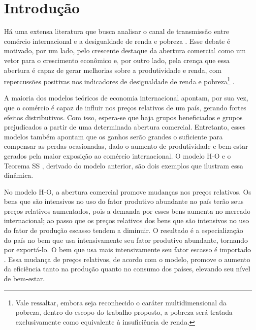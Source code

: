 

\pagestyle{fancy}
\fancyhf{}
\fancyhead[R]{\small\thepage}
\renewcommand{\headrulewidth}{0pt}

\chapter{Introdução} \label{cha:introducao}

Há uma extensa literatura que busca analisar o canal de transmissão entre comércio internacional e a desigualdade de renda e pobreza \cite{ferreira06, castilho12, bayar17, anderson20}. Esse debate é motivado, por um lado, pelo crescente destaque da abertura comercial como um vetor para o crescimento econômico \cite{atkin22} e, por outro lado, pela crença que essa abertura é capaz de gerar melhorias sobre a produtividade e renda, com repercussões positivas nos indicadores de desigualdade de renda e pobreza\footnote{Vale ressaltar, embora seja reconhecido o caráter multidimensional da pobreza, dentro do escopo do trabalho proposto, a pobreza será tratada exclusivamente como equivalente à insuficiência de renda.} \cite{carneiro06}.

A maioria dos modelos teóricos de economia internacional apontam, por sua vez, que o comércio é capaz de influir nos preços relativos de um país, gerando fortes efeitos distributivos. Com isso, espera-se que haja grupos beneficiados e grupos prejudicados a partir de uma determinada abertura comercial. Entretanto, esses modelos também apontam que os ganhos serão grandes o suficiente para compensar as perdas ocasionadas, dado o aumento de produtividade e bem-estar gerados pela maior exposição ao comércio internacional. O modelo H-O \cite{heckscher49, ohlin67} e o Teorema SS \cite{stolper41}, derivado do modelo anterior, são dois exemplos que ilustram essa dinâmica.

No modelo H-O, a abertura comercial promove mudanças nos preços relativos. Os bens que são intensivos no uso do fator produtivo abundante no país terão seus preços relativos aumentados, pois a demanda por esses bens aumenta no mercado internacional; ao passo que os preços relativos dos bens que são intensivos no uso do fator de produção escasso tendem a diminuir. O resultado é a especialização do país no bem que usa intensivamente seu fator produtivo abundante, tornando por exportá-lo. O bem que usa mais intensivamente seu fator escasso é importado \cite{heckscher49, ohlin67}. Essa mudança de preços relativos, de acordo com o modelo, promove o aumento da eficiência tanto na produção quanto no consumo dos países, elevando seu nível de bem-estar.

